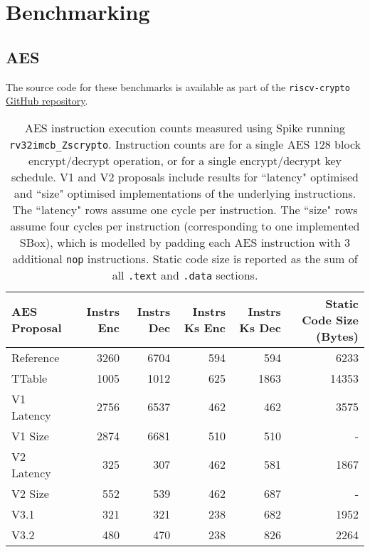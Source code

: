 
\section{Benchmarking}

\subsection{AES}
\label{sec:benchmark:aes}

The source code for these benchmarks is available as part of the
{\tt riscv-crypto} 
\href{https://github.com/scarv/riscv-crypto/tree/master/benchmarks/crypto_block/aes}{GitHub repository}.

\begin{table}[h]
\centering
\begin{tabular}{lrrrrr}
AES Proposal & Instrs Enc & Instrs Dec & Instrs Ks Enc & Instrs Ks Dec & Static Code Size (Bytes) \\ \hline
Reference   & 3260  & 6704  & 594  &  594  & 6233   \\
TTable      & 1005  & 1012  & 625  &  1863 & 14353  \\
V1 Latency  & 2756  & 6537  & 462  &  462  & 3575   \\
V1 Size     & 2874  & 6681  & 510  &  510  & -      \\
V2 Latency  & 325   & 307   & 462  &  581  & 1867   \\
V2 Size     & 552   & 539   & 462  &  687  & -      \\
V3.1        & 321   & 321   & 238  &  682  & 1952   \\
V3.2        & 480   & 470   & 238  &  826  & 2264   \\
\end{tabular}
\caption{
AES instruction execution counts measured using Spike
running {\tt rv32imcb\_Zscrypto}.
Instruction counts are for a single AES 128 block encrypt/decrypt operation,
or for a single encrypt/decrypt key schedule.
V1 and V2 proposals include results for ``latency" optimised and ``size"
optimised implementations of the underlying instructions.
The ``latency" rows assume one cycle per instruction.
The ``size" rows assume four cycles per instruction (corresponding to
one implemented SBox), which is modelled by padding each AES instruction
with 3 additional {\tt nop} instructions.
Static code size is reported as the sum of all {\tt .text} and {\tt .data}
sections.
}
\label{tab:benchmarks:aes:perf}
\end{table}


